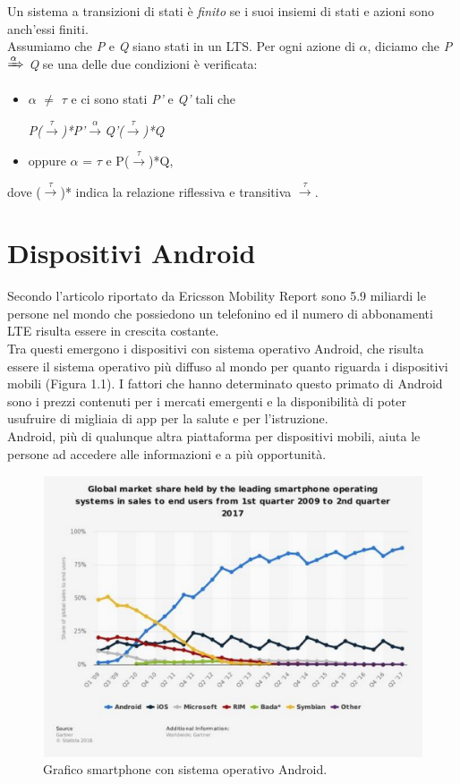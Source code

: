 \documentclass[a4paper,11pt,twoside,openright]{report}
\begin{document}
Un sistema a transizioni di stati è \textit{finito} se i suoi insiemi di stati e azioni sono anch'essi finiti.\\
Assumiamo che \textit{P} e \textit{Q} siano stati in un LTS. Per ogni azione di $\alpha$, diciamo che \textit{P} $\xRightarrow{\alpha}$ \textit{Q} se una delle due condizioni è verificata:

\begin{itemize}
\item $\alpha$ $\neq$ $\tau$ e ci sono stati \textit{P'} e \textit{Q'} tali che\\
\centerline{\textit{P($\xrightarrow{\tau}$)*P'$\xrightarrow{\alpha}$Q'($\xrightarrow{\tau}$)*Q}}

\item oppure $\alpha$ = $\tau$ e P($\xrightarrow{\tau}$)*Q,
\end{itemize}

dove ($\xrightarrow{\tau}$)* indica la relazione riflessiva e transitiva $\xrightarrow{\tau}$.

\section{Dispositivi Android}
Secondo l'articolo riportato da Ericsson Mobility Report \cite{2} sono 5.9 miliardi le persone nel mondo che possiedono un telefonino ed il numero di abbonamenti LTE risulta essere in crescita costante.\\
Tra questi emergono i dispositivi con sistema operativo Android, che risulta essere il sistema operativo più diffuso al mondo per quanto riguarda i dispositivi mobili (Figura 1.1). I fattori che hanno determinato questo primato di Android sono i prezzi contenuti per i mercati emergenti e la disponibilità di poter usufruire di migliaia di app per la salute e per l'istruzione.\\
Android, più di qualunque altra piattaforma per dispositivi mobili, aiuta le persone ad accedere alle informazioni e a più opportunità.

\begin{figure}[h]
\includegraphics[width=\textwidth]{images/Smartphone Android.png}
\caption{Grafico smartphone con sistema operativo Android.}
\end{figure}
\end{document}
